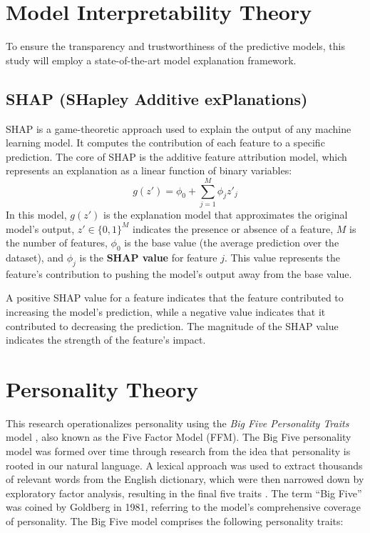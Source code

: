 \section{Model Interpretability Theory}
\label{sec:interpretability_theory}
To ensure the transparency and trustworthiness of the predictive models, this study will employ a state-of-the-art model explanation framework.

\subsection{SHAP (SHapley Additive exPlanations)}
SHAP is a game-theoretic approach used to explain the output of any machine learning model. It computes the contribution of each feature to a specific prediction. The core of SHAP is the additive feature attribution model, which represents an explanation as a linear function of binary variables:
$$g(z') = \phi_0 + \sum_{j=1}^{M} \phi_j z'_j$$
In this model, $g(z')$ is the explanation model that approximates the original model's output, $z' \in \{0, 1\}^M$ indicates the presence or absence of a feature, $M$ is the number of features, $\phi_0$ is the base value (the average prediction over the dataset), and $\phi_j$ is the \textbf{SHAP value} for feature $j$. This value represents the feature's contribution to pushing the model's output away from the base value.

A positive SHAP value for a feature indicates that the feature contributed to increasing the model's prediction, while a negative value indicates that it contributed to decreasing the prediction. The magnitude of the SHAP value indicates the strength of the feature’s impact.

\section{Personality Theory}

This research operationalizes personality using the \textit{Big Five Personality Traits} model \citep{costa1999five}, also known as the Five Factor Model (FFM). The Big Five personality model was formed over time through research from the idea that personality is rooted in our natural language. A lexical approach was used to extract thousands of relevant words from the English dictionary, which were then narrowed down by exploratory factor analysis, resulting in the final five traits \citep{feher2021looking}. The term “Big Five” was coined by Goldberg in 1981, referring to the model’s comprehensive coverage of personality. The Big Five model comprises the following personality traits:

